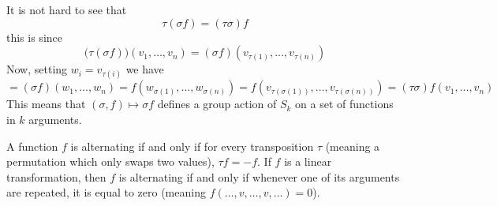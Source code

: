 \documentclass[10pt]{article}
\begin{document}
It is not hard to see that
\[ \tau(\sigma f) = (\tau\sigma)f \]
this is since
\[ \bigl(\tau(\sigma f)\bigr)(v_1,\dots,v_n) = (\sigma f)(v_{\tau(1)},\dots,v_{\tau(n)}) \]
Now, setting $w_i=v_{\tau(i)}$ we have
\[ = (\sigma f)(w_1,\dots,w_n) = f(w_{\sigma(1)},\dots,w_{\sigma(n)}) = f(v_{\tau(\sigma(1))},\dots,v_{\tau(\sigma(n))}) = (\tau\sigma)f(v_1,\dots,v_n) \]
This means that $(\sigma,f)\mapsto\sigma f$ defines a group action of $S_k$ on a set of functions in $k$ arguments.

\begin{prop*}[alternationEquivalence]

    A function $f$ is alternating if and only if for every transposition $\tau$ (meaning a permutation which only swaps two values), $\tau f=-f$.
    If $f$ is a linear transformation, then $f$ is alternating if and only if whenever one of its arguments are repeated, it is equal to zero (meaning $f(\dots,v,\dots,v,\dots)=0$).

\end{prop*}
\end{document}
